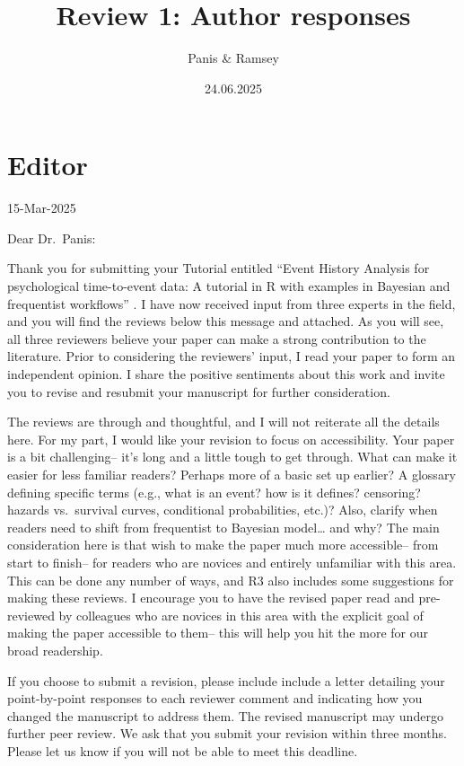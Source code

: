 \documentclass[
]{article}
\title{Review 1: Author responses}
\author{Panis \& Ramsey}
\date{24.06.2025}
\renewenvironment{quote}{\begin{leftbar}}{\end{leftbar}}
\begin{document}
\maketitle

\section{Editor}\label{editor}

\begin{quote}
15-Mar-2025

Dear Dr.~Panis:

Thank you for submitting your Tutorial entitled ``Event History Analysis
for psychological time-to-event data: A tutorial in R with examples in
Bayesian and frequentist workflows'' . I have now received input from
three experts in the field, and you will find the reviews below this
message and attached. As you will see, all three reviewers believe your
paper can make a strong contribution to the literature. Prior to
considering the reviewers' input, I read your paper to form an
independent opinion. I share the positive sentiments about this work and
invite you to revise and resubmit your manuscript for further
consideration.
\end{quote}

\begin{quote}
The reviews are through and thoughtful, and I will not reiterate all the
details here. For my part, I would like your revision to focus on
accessibility. Your paper is a bit challenging-- it's long and a little
tough to get through. What can make it easier for less familiar readers?
Perhaps more of a basic set up earlier? A glossary defining specific
terms (e.g., what is an event? how is it defines? censoring? hazards
vs.~survival curves, conditional probabilities, etc.)? Also, clarify
when readers need to shift from frequentist to Bayesian model\ldots{}
and why? The main consideration here is that wish to make the paper much
more accessible-- from start to finish-- for readers who are novices and
entirely unfamiliar with this area. This can be done any number of ways,
and R3 also includes some suggestions for making these reviews. I
encourage you to have the revised paper read and pre-reviewed by
colleagues who are novices in this area with the explicit goal of making
the paper accessible to them-- this will help you hit the more for our
broad readership.
\end{quote}

\begin{quote}
If you choose to submit a revision, please include include a letter
detailing your point-by-point responses to each reviewer comment and
indicating how you changed the manuscript to address them. The revised
manuscript may undergo further peer review. We ask that you submit your
revision within three months. Please let us know if you will not be able
to meet this deadline.
\end{quote}
\end{document}
